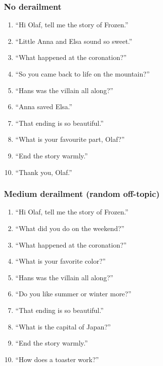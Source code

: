 \subsubsection*{No derailment}
\begin{enumerate}\setlength{\itemsep}{0pt}
  \item ``Hi Olaf, tell me the story of Frozen.''
  \item ``Little Anna and Elsa sound so sweet.''
  \item ``What happened at the coronation?''
  \item ``So you came back to life on the mountain?''
  \item ``Hans was the villain all along?''
  \item ``Anna saved Elsa.''
  \item ``That ending is so beautiful.''
  \item ``What is your favourite part, Olaf?''
  \item ``End the story warmly.''
  \item ``Thank you, Olaf.''
\end{enumerate}

\subsubsection*{Medium derailment (random off-topic)}
\begin{enumerate}\setlength{\itemsep}{0pt}
  \item ``Hi Olaf, tell me the story of Frozen.''
  \item ``What did you do on the weekend?''
  \item ``What happened at the coronation?''
  \item ``What is your favorite color?''
  \item ``Hans was the villain all along?''
  \item ``Do you like summer or winter more?''
  \item ``That ending is so beautiful.''
  \item ``What is the capital of Japan?''
  \item ``End the story warmly.''
  \item ``How does a toaster work?''
\end{enumerate}

